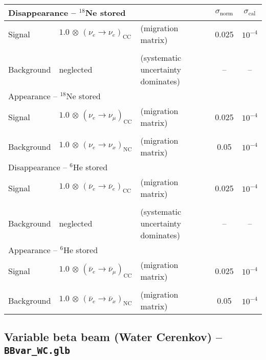 \begin{appendix}
\begin{center}
\begin{tabular}{|l|ll|c|c|}
\hline \hline
\multicolumn{3}{|l|}{Disappearance -- $^{18}$Ne stored} & $\sigma_\mathrm{norm}$ & $\sigma_\mathrm{cal}$ \\ \hline
Signal & $1.0 \, \otimes \, (\nu_e\rightarrow\nu_e)_{\mathrm{CC}}$ & (migration matrix) & 0.025 & $10^{-4}$ \\
 & & & & \\
Background & neglected & (systematic uncertainty dominates) & -- & -- \\ \hline \hline 
\multicolumn{3}{|l|}{Appearance -- $^{18}$Ne stored} & & \\ \hline
Signal & $1.0 \, \otimes \, (\nu_e \rightarrow \nu_\mu)_\mathrm{CC}$ & (migration matrix) & 0.025 & $10^{-4}$ \\
 & & & & \\
Background & $1.0 \, \otimes \, (\nu_e \rightarrow \nu_x)_\mathrm{NC}$ & (migration matrix) & 0.05 & $10^{-4}$
\\ \hline \hline
\multicolumn{3}{|l|}{Disappearance -- $^6$He stored} & &  \\ \hline
Signal & $1.0 \, \otimes \, (\bar{\nu}_e\rightarrow\bar{\nu}_e)_{\mathrm{CC}}$ & (migration matrix) & 0.025 & $10^{-4}$ \\
 & & & & \\
Background & neglected & (systematic uncertainty dominates) & -- & -- \\ \hline \hline 
\multicolumn{3}{|l|}{Appearance -- $^6$He stored} & & \\ \hline
Signal & $1.0 \, \otimes \, (\bar{\nu}_e \rightarrow \bar{\nu}_\mu)_\mathrm{CC}$ & (migration matrix)  &
0.025 & $10^{-4}$ \\
 & & & & \\
Background & $1.0 \, \otimes \, (\bar{\nu}_e \rightarrow \bar{\nu}_x)_\mathrm{NC}$ & (migration matrix) & 0.05 & $10^{-4}$ \\ \hline \hline
\end{tabular}
\end{center}

\subsection*{Variable beta beam (Water Cerenkov) -- {\tt BBvar\_WC.glb}}


\end{appendix}
